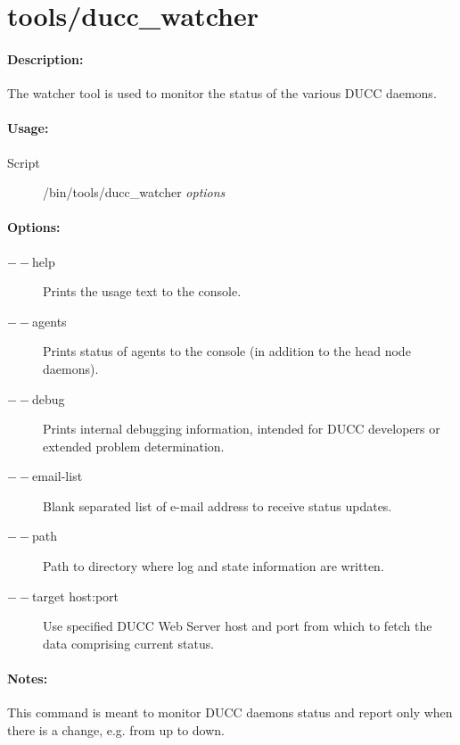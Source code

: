 % 
% 
% 
% 
\ifpdf
\else
{}
\fi
    \section{tools/ducc\_watcher}
    \label{sec:cli.tools-ducc-watcher}    

  \paragraph{Description:}
    The watcher tool is used to monitor the status of the various DUCC daemons. 
   
  \paragraph{Usage:}
    \begin{description}
    \item[Script] \ducchome/bin/tools/ducc\_watcher {\em options}
    \end{description}
    
  \paragraph{Options:}
    \begin{description}
    	\item[$--$help]
          Prints the usage text to the console. 
        \item[$--$agents]
          Prints status of agents to the console (in addition to the head node daemons). 
        \item[$--$debug]          
          Prints internal debugging information, intended for DUCC developers or extended problem determination.      
        \item[$--$email-list]          
          Blank separated list of e-mail address to receive status updates.    
        \item[$--$path]          
          Path to directory where log and state information are written.  
        \item[$--$target host:port]          
          Use specified DUCC Web Server host and port from which to fetch the data comprising current status.                                                                                               
     \end{description}
            
  \paragraph{Notes:}
    This command is meant to monitor DUCC daemons status and report only when there is a change, e.g. from up to down.
       